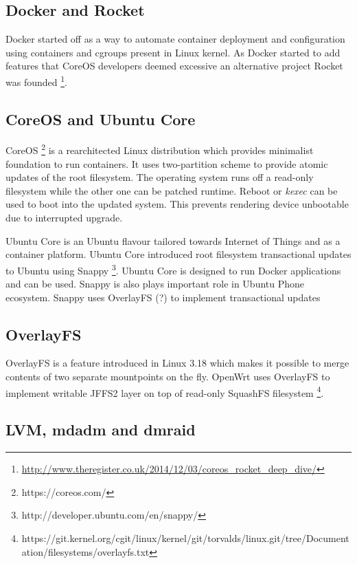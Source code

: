 \documentclass{article}
\begin{document}
\subsection{Docker and Rocket}

Docker started off as a way to automate container deployment and configuration
using containers and cgroups present in Linux kernel. As Docker started to add
features that CoreOS developers deemed excessive an alternative project Rocket
was founded
\footnote{\url{http://www.theregister.co.uk/2014/12/03/coreos_rocket_deep_dive/}}.

\subsection{CoreOS and Ubuntu Core}

CoreOS \footnote{https://coreos.com/} is a rearchitected Linux distribution
which provides minimalist foundation to run containers.
It uses two-partition scheme to provide atomic updates of the root filesystem.
The operating system runs off a read-only filesystem while the other one
can be patched runtime. Reboot or \emph{kexec} can be used to boot into
the updated system.
This prevents rendering device unbootable due to interrupted upgrade.

Ubuntu Core is an Ubuntu flavour tailored towards Internet of Things and as a
container platform.
Ubuntu Core introduced root filesystem transactional
updates to Ubuntu using Snappy
\footnote{http://developer.ubuntu.com/en/snappy/}.
Ubuntu Core is designed to run Docker applications and can be used.
Snappy is also plays important role in Ubuntu Phone ecosystem.
Snappy uses OverlayFS (?) to implement transactional updates 


\subsection{OverlayFS}

OverlayFS is a feature introduced in Linux 3.18 which makes it possible to merge contents of two separate mountpoints on the fly.
OpenWrt uses OverlayFS to implement writable JFFS2 layer on top of read-only SquashFS filesystem
\footnote{https://git.kernel.org/cgit/linux/kernel/git/torvalds/linux.git/tree/Documentation/filesystems/overlayfs.txt}.

\subsection{LVM, mdadm and dmraid}
\end{document}
